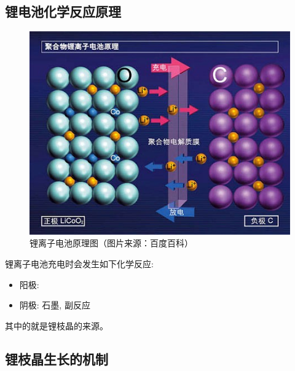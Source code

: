 \documentclass{article}
\begin{document}
\subsection{锂电池化学反应原理}
\begin{figure}[H]
 \centering
 \includegraphics[scale=0.6]{figs/1.jpg}
\caption{锂离子电池原理图（图片来源：百度百科）}
\end{figure}

	锂离子电池充电时会发生如下化学反应:
		\begin{itemize}
			\item 阳极: 
			\item 阴极: 石墨, 副反应 
		\end{itemize}
		
其中的就是锂枝晶的来源。

\subsection{锂枝晶生长的机制}
\end{document}
